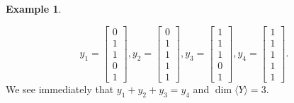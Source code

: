 \documentclass[12pt]{article}
\theoremstyle{definition}
\newtheorem{exmp}{Example}
\begin{document}
\begin{exmp}
\begin{enumerate}[a)]
                 $$y_1=\left[\begin{matrix}
                                                        0 \\
                                                        1 \\
                                                        1 \\
                                                        0 \\
                                                        1
                                                      \end{matrix}\right], y_2=\left[\begin{matrix}
                                                        0 \\
                                                        1 \\
                                                        1 \\
                                                        1 \\
                                                        1
                                                      \end{matrix}\right], y_3=\left[\begin{matrix}
                                                        1 \\
                                                        1 \\
                                                        1 \\
                                                        0 \\
                                                        1
                                                      \end{matrix}\right], y_4=\left[\begin{matrix}
                                                        1 \\
                                                        1 \\
                                                        1 \\
                                                        1 \\
                                                        1
                                                      \end{matrix}\right].$$ We see immediately that $y_1+y_2+y_3=y_4$ and $\dim\langle Y\rangle=3$.


\end{enumerate}
\end{exmp}
\end{document}
